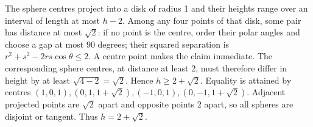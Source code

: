 The sphere centres project into a disk of radius 1 and their heights range over an interval of length at most $h-2$. Among any four points of that disk, some pair has distance at most $\sqrt2$: if no point is the centre, order their polar angles and choose a gap at most 90 degrees; their squared separation is $r^2+s^2-2rs\cos\theta\le2$. A centre point makes the claim immediate. The corresponding sphere centres, at distance at least 2, must therefore differ in height by at least $\sqrt{4-2}=\sqrt2$. Hence $h\ge2+\sqrt2$. Equality is attained by centres $(1,0,1),(0,1,1+\sqrt2),(-1,0,1),(0,-1,1+\sqrt2)$. Adjacent projected points are $\sqrt2$ apart and opposite points 2 apart, so all spheres are disjoint or tangent. Thus $\boxed{h=2+\sqrt2}$.
